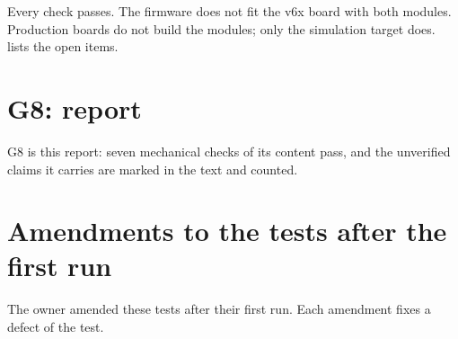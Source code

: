 \begin{keyresult}
Every check passes.
The firmware does not fit the v6x board with both modules.
Production boards do not build the modules; only the simulation target does.
 lists the open items.
\end{keyresult}

\section{G8: report}\label{sec:val_g8}

G8 is this report: seven mechanical checks of its content pass, and the unverified claims it carries are marked in the text and counted.

\section{Amendments to the tests after the first run}\label{sec:val_amendments}

The owner amended these tests after their first run.
Each amendment fixes a defect of the test.

